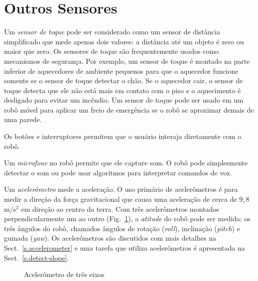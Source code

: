 \section{Outros Sensores}\label{s.other-sensors}

Um \emph{sensor de toque} pode ser considerado como um sensor de distância simplificado que mede apenas dois valores: a distância até um objeto é zero ou maior que zero. Os sensores de toque são frequentemente usados como mecanismos de segurança. Por exemplo, um sensor de toque é montado na parte inferior de aquecedores de ambiente pequenos para que o aquecedor funcione somente se o sensor de toque detectar o chão. Se o aquecedor cair, o sensor de toque detecta que ele não está mais em contato com o piso e o aquecimento é desligado para evitar um incêndio. Um sensor de toque pode ser usado em um robô móvel para aplicar um freio de emergência se o robô se aproximar demais de uma parede.

Os botões e interruptores permitem que o usuário interaja diretamente com o robô.

Um \emph{microfone} no robô permite que ele capture som. O robô pode simplesmente detectar o som ou pode usar algoritmos para interpretar comandos de voz.

Um \emph{acelerômetro} mede a aceleração. O uso primário de acelerômetros é para medir a direção da força gravitacional que causa uma aceleração de cerca de $9,8$ m/s$^{2}$ em direção ao centro da terra. Com três acelerômetros montados perpendicularmente um ao outro (Fig.~\ref{fig.accel}), a \emph{atitude} do robô pode ser medida: os três ângulos do robô, chamados ângulos de rotação (\emph{roll}), inclinação (\emph{pitch}) e guinada (\emph{yaw}). Os acelerômetros são discutidos com mais detalhes na Sect.~\ref{s.accelerometer} e uma tarefa que utiliza acelerômetros é apresentada na Sect.~\ref{s.detect-slope}.

\begin{figure}
\begin{center}
\caption{Acelerômetro de três eixos}\label{fig.accel}
\end{center}
\end{figure}


